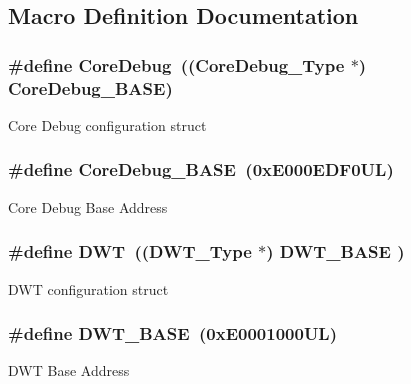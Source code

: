 \subsection{Macro Definition Documentation}
\subsubsection[{\texorpdfstring{Core\+Debug}{CoreDebug}}]{\setlength{\rightskip}{0pt plus 5cm}\#define Core\+Debug~(({\bf Core\+Debug\+\_\+\+Type} $\ast$)     {\bf Core\+Debug\+\_\+\+B\+A\+SE})}\hypertarget{group___c_m_s_i_s__core__base_gab6e30a2b802d9021619dbb0be7f5d63d}{}\label{group___c_m_s_i_s__core__base_gab6e30a2b802d9021619dbb0be7f5d63d}
Core Debug configuration struct 
\subsubsection[{\texorpdfstring{Core\+Debug\+\_\+\+B\+A\+SE}{CoreDebug_BASE}}]{\setlength{\rightskip}{0pt plus 5cm}\#define Core\+Debug\+\_\+\+B\+A\+SE~(0x\+E000\+E\+D\+F0\+U\+L)}\hypertarget{group___c_m_s_i_s__core__base_ga680604dbcda9e9b31a1639fcffe5230b}{}\label{group___c_m_s_i_s__core__base_ga680604dbcda9e9b31a1639fcffe5230b}
Core Debug Base Address 
\subsubsection[{\texorpdfstring{D\+WT}{DWT}}]{\setlength{\rightskip}{0pt plus 5cm}\#define D\+WT~(({\bf D\+W\+T\+\_\+\+Type}       $\ast$)     {\bf D\+W\+T\+\_\+\+B\+A\+SE}      )}\hypertarget{group___c_m_s_i_s__core__base_gabbe5a060185e1d5afa3f85b14e10a6ce}{}\label{group___c_m_s_i_s__core__base_gabbe5a060185e1d5afa3f85b14e10a6ce}
D\+WT configuration struct 
\subsubsection[{\texorpdfstring{D\+W\+T\+\_\+\+B\+A\+SE}{DWT_BASE}}]{\setlength{\rightskip}{0pt plus 5cm}\#define D\+W\+T\+\_\+\+B\+A\+SE~(0x\+E0001000\+U\+L)}\hypertarget{group___c_m_s_i_s__core__base_gafdab534f961bf8935eb456cb7700dcd2}{}\label{group___c_m_s_i_s__core__base_gafdab534f961bf8935eb456cb7700dcd2}
D\+WT Base Address 
